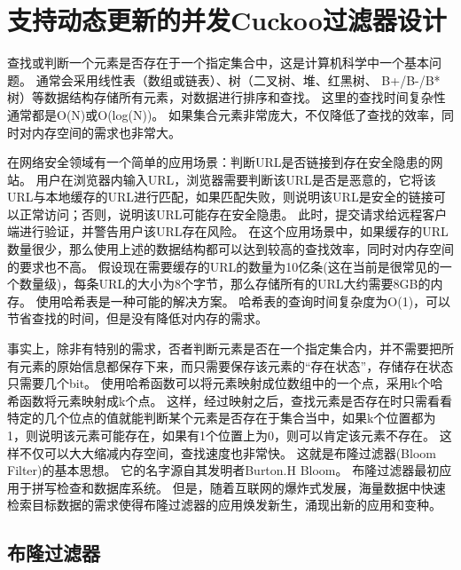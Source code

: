 \chapter{支持动态更新的并发Cuckoo过滤器设计}
查找或判断一个元素是否存在于一个指定集合中，这是计算机科学中一个基本问题。
通常会采用线性表（数组或链表）、树（二叉树、堆、红黑树、 B+/B-/B*树）等数据结构存储所有元素，对数据进行排序和查找。
这里的查找时间复杂性通常都是O(N)或O(log(N))。
如果集合元素非常庞大，不仅降低了查找的效率，同时对内存空间的需求也非常大。

在网络安全领域有一个简单的应用场景：判断URL是否链接到存在安全隐患的网站。
用户在浏览器内输入URL，浏览器需要判断该URL是否是恶意的，它将该URL与本地缓存的URL进行匹配，如果匹配失败，则说明该URL是安全的链接可以正常访问；否则，说明该URL可能存在安全隐患。
此时，提交请求给远程客户端进行验证，并警告用户该URL存在风险。
在这个应用场景中，如果缓存的URL数量很少，那么使用上述的数据结构都可以达到较高的查找效率，同时对内存空间的要求也不高。
假设现在需要缓存的URL的数量为10亿条(这在当前是很常见的一个数量级)，每条URL的大小为8个字节，那么存储所有的URL大约需要8GB的内存。
使用哈希表是一种可能的解决方案。
哈希表的查询时间复杂度为O(1)，可以节省查找的时间，但是没有降低对内存的需求。

事实上，除非有特别的需求，否者判断元素是否在一个指定集合内，并不需要把所有元素的原始信息都保存下来，而只需要保存该元素的“存在状态”，存储存在状态只需要几个bit。
使用哈希函数可以将元素映射成位数组中的一个点，采用k个哈希函数将元素映射成k个点。
这样，经过映射之后，查找元素是否存在时只需看看特定的几个位点的值就能判断某个元素是否存在于集合当中，如果k个位置都为1，则说明该元素可能存在，如果有1个位置上为0，则可以肯定该元素不存在。
这样不仅可以大大缩减内存空间，查找速度也非常快。
这就是布隆过滤器(Bloom Filter)的基本思想。
它的名字源自其发明者Burton.H Bloom\cite{bloom1970space}。
布隆过滤器最初应用于拼写检查和数据库系统。
但是，随着互联网的爆炸式发展，海量数据中快速检索目标数据的需求使得布隆过滤器的应用焕发新生，涌现出新的应用和变种\cite{song2005fast,bonomi2006improved,yu2009buffalo,bender2012don}。

\section{布隆过滤器}

